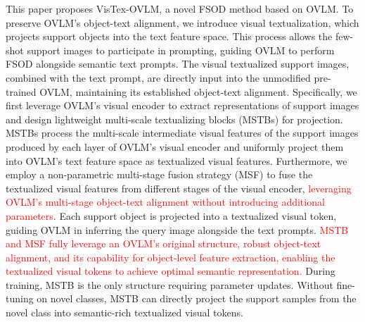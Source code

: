 \documentclass[10pt,twocolumn,letterpaper]{article}
\begin{document}
This paper proposes VisTex-OVLM, a novel FSOD method based on OVLM. To preserve OVLM’s object-text alignment, we introduce visual textualization, which projects support objects into the text feature space. This process allows the few-shot support images to participate in prompting, guiding OVLM to perform FSOD alongside semantic text prompts. The visual textualized support images, combined with the text prompt, are directly input into the unmodified pre-trained OVLM, maintaining its established object-text alignment. Specifically, we first leverage OVLM’s visual encoder to extract representations of support images and design lightweight multi-scale textualizing blocks (MSTBs) for projection. MSTBs process the multi-scale intermediate visual features of the support images produced by each layer of OVLM’s visual encoder and uniformly project them into OVLM’s text feature space as textualized visual features. Furthermore, we employ a non-parametric multi-stage fusion strategy (MSF) to fuse the textualized visual features from different stages of the visual encoder, \textcolor{red}{leveraging OVLM’s multi-stage object-text alignment without introducing additional parameters}. Each support object is projected into a textualized visual token, guiding OVLM in inferring the query image alongside the text prompts. \textcolor{red}{MSTB and MSF fully leverage an OVLM’s original structure, robust object-text alignment, and its capability for object-level feature extraction, enabling the textualized visual tokens to achieve optimal semantic representation.} During training, MSTB is the only structure requiring parameter updates. Without fine-tuning on novel classes, MSTB can directly project the support samples from the novel class into semantic-rich textualized visual tokens. 
\end{document}
